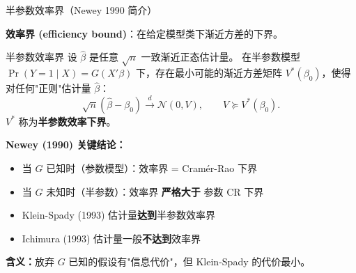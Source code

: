 \documentclass[aspectratio=169, 10pt]{beamer}
\begin{document}
\begin{frame}{半参数效率界（Newey 1990 简介）}

  \textbf{效率界 (efficiency bound)}：在给定模型类下渐近方差的下界。

  \vspace{0.3em}
  \begin{definitionbox}{半参数效率界}
    设 $\hat\beta$ 是任意 $\sqrt{n}$ 一致渐近正态估计量。
    在半参数模型 $\Pr(Y=1\mid X) = G(X'\beta)$ 下，存在最小可能的渐近方差矩阵
    $V^{*}(\beta_0)$，使得对任何"正则"估计量 $\hat\beta$：
    $$\sqrt{n}(\hat\beta - \beta_0) \overset{d}{\to} \mathcal{N}(0, V),
    \qquad V \succeq V^{*}(\beta_0).$$
    $V^{*}$ 称为\textbf{半参数效率下界}。
  \end{definitionbox}

  \begin{highlightbox}
    \textbf{Newey (1990) 关键结论：}
    \begin{itemize}\setlength{\itemsep}{1pt}
      \item 当 $G$ 已知时（参数模型）：效率界 = Cramér-Rao 下界
      \item 当 $G$ 未知时（半参数）：效率界 \textbf{严格大于} 参数 CR 下界
      \item Klein-Spady (1993) 估计量\textbf{达到}半参数效率界
      \item Ichimura (1993) 估计量一般\textbf{不达到}效率界
    \end{itemize}
  \end{highlightbox}

  \textbf{含义：}放弃 $G$ 已知的假设有"信息代价"，但 Klein-Spady 的代价最小。

  \hypertarget{main-c10}{}
  \hfill{\scriptsize\hyperlink{proof-c10}{}}

\end{frame}
\end{document}
